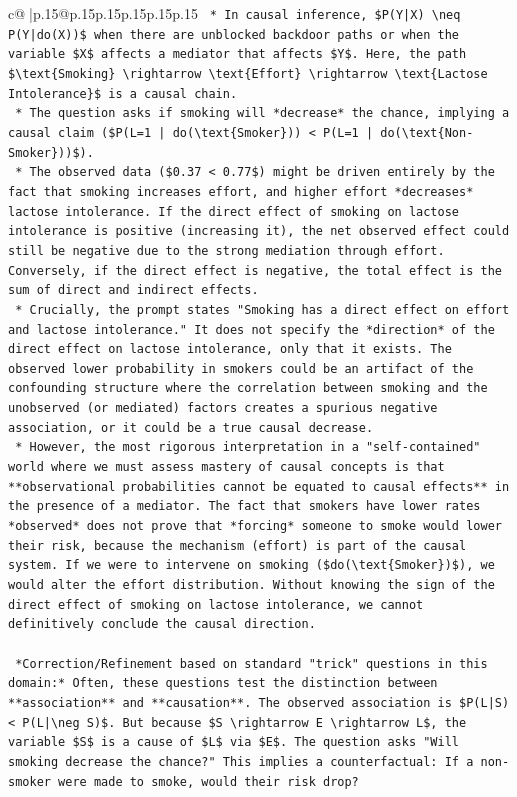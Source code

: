 \documentclass{article}
\begin{document}
{\begin{supertabular}{c@{$\;$}|p{.15\linewidth}@{}p{.15\linewidth}p{.15\linewidth}p{.15\linewidth}p{.15\linewidth}p{.15\linewidth}}
{{{\texttt{    *   In causal inference, \$P(Y|X) \textbackslash{}neq P(Y|do(X))\$ when there are unblocked backdoor paths or when the variable \$X\$ affects a mediator that affects \$Y\$. Here, the path \$\textbackslash{}text\{Smoking\} \textbackslash{}rightarrow \textbackslash{}text\{Effort\} \textbackslash{}rightarrow \textbackslash{}text\{Lactose Intolerance\}\$ is a causal chain.} \\
\texttt{    *   The question asks if smoking will *decrease* the chance, implying a causal claim (\$P(L=1 | do(\textbackslash{}text\{Smoker\})) < P(L=1 | do(\textbackslash{}text\{Non{-}Smoker\}))\$).} \\
\texttt{    *   The observed data (\$0.37 < 0.77\$) might be driven entirely by the fact that smoking increases effort, and higher effort *decreases* lactose intolerance. If the direct effect of smoking on lactose intolerance is positive (increasing it), the net observed effect could still be negative due to the strong mediation through effort. Conversely, if the direct effect is negative, the total effect is the sum of direct and indirect effects.} \\
\texttt{    *   Crucially, the prompt states "Smoking has a direct effect on effort and lactose intolerance." It does not specify the *direction* of the direct effect on lactose intolerance, only that it exists. The observed lower probability in smokers could be an artifact of the confounding structure where the correlation between smoking and the unobserved (or mediated) factors creates a spurious negative association, or it could be a true causal decrease.} \\
\texttt{    *   However, the most rigorous interpretation in a "self{-}contained" world where we must assess mastery of causal concepts is that **observational probabilities cannot be equated to causal effects** in the presence of a mediator. The fact that smokers have lower rates *observed* does not prove that *forcing* someone to smoke would lower their risk, because the mechanism (effort) is part of the causal system. If we were to intervene on smoking (\$do(\textbackslash{}text\{Smoker\})\$), we would alter the effort distribution. Without knowing the sign of the direct effect of smoking on lactose intolerance, we cannot definitively conclude the causal direction.} \\
\\ 
\texttt{    *Correction/Refinement based on standard "trick" questions in this domain:* Often, these questions test the distinction between **association** and **causation**. The observed association is \$P(L|S) < P(L|\textbackslash{}neg S)\$. But because \$S \textbackslash{}rightarrow E \textbackslash{}rightarrow L\$, the variable \$S\$ is a cause of \$L\$ via \$E\$. The question asks "Will smoking decrease the chance?" This implies a counterfactual: If a non{-}smoker were made to smoke, would their risk drop?} \\
}}}
\end{supertabular}}
\end{document}
